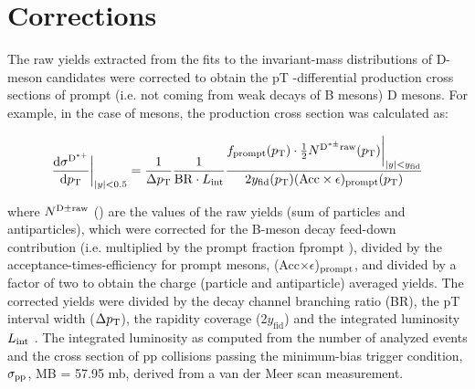 \section{Corrections}
\label{sec:eff}


The raw yields extracted from the fits to the invariant-mass distributions of D-meson candidates were
corrected to obtain the pT -differential production cross sections of prompt (i.e. not coming from weak
decays of B mesons) D mesons. For example, in the case of \Dstar mesons, the production cross section
was calculated as:

\begin{equation}
 \label{eq:effMethod}
 \frac{\mathrm{d}\sigma^{\rm D^{\ast +}}}{\mathrm{d}p_{\mathrm{T}}}\bigg\rvert_{|y|<0.5} = \frac{1}{\Delta p_{\mathrm{T}}} \frac{1}{\mathrm{BR} \cdot {L_{\rm int}}} \frac{f_{\mathrm{prompt}}(p_{\mathrm{T}})\cdot \frac{1}{2} N^{\mathrm{D^{\ast \pm}raw}}(p_{\mathrm{T}})\bigg\rvert_{|y| < y_{\mathrm{fid}}}}{ 2y_{\rm fid}(p_{\rm T})(\mathrm{Acc}\times\epsilon)_{\mathrm{prompt}}(p_{\mathrm{T}})  }
\end{equation}


where $N^{\rm D{\pm \rm raw}}$ (\pt) are the values of the raw yields (sum of particles and antiparticles), which were corrected for the B-meson decay feed-down contribution (i.e. multiplied by the prompt fraction fprompt ),
divided by the acceptance-times-efficiency for prompt \Dstar mesons, (Acc$\times \epsilon$)$_{\rm prompt}$, and divided by a factor of two to obtain the charge (particle and antiparticle) averaged yields. The corrected yields were divided by the decay channel branching ratio (BR), the pT interval width ($\Delta p_{\rm T}$), the rapidity coverage (2$y_{\mathrm{fid}}$) and the integrated luminosity $L_{\rm int}$ . The integrated luminosity as computed from the number of analyzed events and the cross section of pp collisions passing the minimum-bias trigger condition, $\sigma_{\rm pp}$, MB = 57.95 mb, derived from a van der Meer scan measurement.

